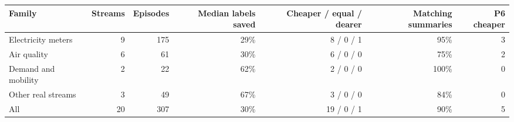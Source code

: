 \begin{tabular}{lrrrrrr}
\toprule
Family & Streams & Episodes & Median labels saved & Cheaper / equal / dearer & Matching summaries & P6 cheaper \\
\midrule
Electricity meters & 9 & 175 & 29\% & 8 / 0 / 1 & 95\% & 3 \\
Air quality & 6 & 61 & 30\% & 6 / 0 / 0 & 75\% & 2 \\
Demand and mobility & 2 & 22 & 62\% & 2 / 0 / 0 & 100\% & 0 \\
Other real streams & 3 & 49 & 67\% & 3 / 0 / 0 & 84\% & 0 \\
\midrule
All & 20 & 307 & 30\% & 19 / 0 / 1 & 90\% & 5 \\
\bottomrule
\end{tabular}
